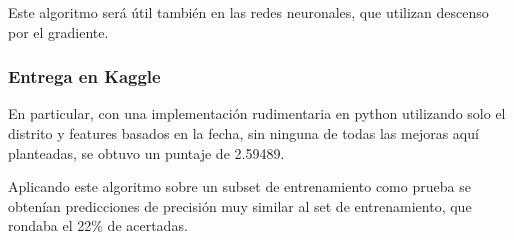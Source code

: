 Este algoritmo será útil también en las redes neuronales, que utilizan descenso por el gradiente.

\subsubsection{Entrega en Kaggle}
En particular, con una implementación rudimentaria en python utilizando solo el distrito y features basados en la fecha, sin ninguna de todas las mejoras aquí planteadas, se obtuvo un puntaje de 2.59489.

Aplicando este algoritmo sobre un subset de entrenamiento como prueba se obtenían predicciones de precisión muy similar al set de entrenamiento, que rondaba el 22\% de acertadas.

